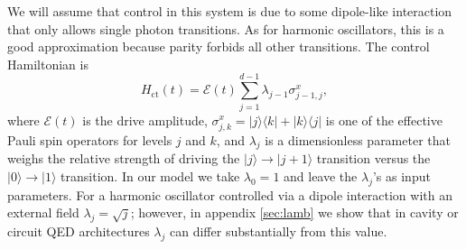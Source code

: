 \documentclass[pra,twocolumn,floatfix,superscriptaddress,eqsecnum]{revtex4-1}
\newcommand{\bra}[1]{\langle{#1}|}
\newcommand{\ket}[1]{|{#1}\rangle}
\newcommand{\jcomment}[1]{\emph{\color[rgb]{0,0,0.6}(#1)}}
\begin{document}

We will assume that control in this system is due to some dipole-like interaction that only allows single photon transitions. As for harmonic oscillators, this is a good approximation because parity forbids all other transitions. The control Hamiltonian is
\begin{equation}\label{eq:controlham}
    H_\mathrm{ct}(t)=\mathcal{E}(t)\sum_{j=1}^{d-1}\lambda_{j-1}\sigma^x_{j-1,j},
\end{equation} where $\mathcal{E}(t)$ is the drive amplitude,  $\sigma^x_{j,k}=\ket{j}\bra{k}+\ket{k}\bra{j}$ is one of the effective Pauli spin operators for levels $j$ and $k$, and $\lambda_j$ is a dimensionless parameter that weighs the relative strength of driving the $\ket{j}\rightarrow \ket{j+1}$ transition versus the $\ket{0}\rightarrow \ket{1}$ transition.  In our model we take $\lambda_0=1$ and leave the $\lambda_j$'s as input parameters. For a harmonic oscillator controlled via a dipole interaction with an external field $\lambda_j=\sqrt{j}$;
however, in appendix \ref{sec:lamb} we show that in cavity or circuit QED architectures $\lambda_j$ can differ substantially from this value.
\end{document}

